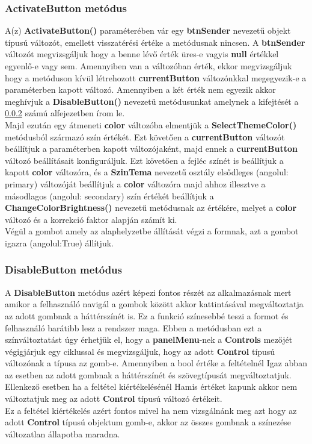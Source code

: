 \documentclass[tocnopagenum]{thesis-ekf}
\theoremstyle{definition}
\theoremstyle{remark}
\begin{document}
	\subsubsection{ActivateButton metódus}
	A(z) \textbf{ActivateButton()} paraméterében vár egy \textbf{btnSender} nevezetű objekt típusú változót, emellett visszatérési értéke a metódusnak nincsen. A \textbf{btnSender} változót megvizsgáljuk hogy a benne lévő érték üres-e vagyis \textbf{null} értékkel egyenlő-e vagy sem. Amennyiben van a változóban érték, ekkor megvizsgáljuk hogy a metóduson kívül létrehozott \textbf{currentButton} változónkkal megegyezik-e a paraméterben kapott változó. Amennyiben a két érték nem egyezik akkor meghívjuk a \textbf{DisableButton()} nevezetű metódusunkat amelynek a kifejtését a \ref{Disablebuttonlabel} számú alfejezetben írom le.
	\\
	 Majd ezután egy átmeneti \textbf{color} változóba elmentjük a \textbf{SelectThemeColor()} metódusból származó szín értékét. Ezt követően a \textbf{currentButton} változót beállítjuk a paraméterben kapott változójaként, majd ennek a \textbf{currentButton} változó beállításait konfiguráljuk. Ezt követően a fejléc színét is beállítjuk a kapott \textbf{color} változóra, és a \textbf{SzinTema} nevezetű osztály elsődleges (angolul: primary) változóját beállítjuk a \textbf{color} változóra majd ahhoz illesztve a másodlagos (angolul: secondary) szín értékét beállítjuk a \textbf{ChangeColorBrightness()} nevezetű metódusnak az értékére, melyet a \textbf{color} változó és a korrekció faktor alapján számít ki.
	 \\
	 Végül a gombot amely az alaphelyzetbe állítását végzi a formnak, azt a gombot igazra (angolul:True) állítjuk.
	\subsubsection{DisableButton metódus}
	\label{Disablebuttonlabel}
	A \textbf{DisableButton} metódus azért képezi fontos részét az alkalmazásnak mert amikor a felhasználó navigál a gombok között akkor kattintásával megváltoztatja az adott gombnak a háttérszínét is. Ez a funkció színesebbé teszi a formot és felhasználó barátibb lesz a rendszer maga. Ebben a metódusban ezt a színváltoztatást úgy érhetjük el, hogy a \textbf{panelMenu}-nek a \textbf{Controls} mezőjét végigjárjuk egy ciklussal és megvizsgáljuk, hogy az adott \textbf{Control} típusú változónak a típusa az gomb-e.
	Amennyiben a bool értéke a feltételnél Igaz abban az esetben az adott gombnak a háttérszínét és szövegtípusát megváltoztatjuk.
	\\
	Ellenkező esetben ha a feltétel kiértékelésénél Hamis értéket kapunk akkor nem változtatjuk meg az adott \textbf{Control} típusú változó értékeit.
	\\ 
	Ez a feltétel kiértékelés azért fontos mivel ha nem vizsgálnánk meg azt hogy az adott \textbf{Control} típusú objektum gomb-e, akkor az összes gombnak a színezése változatlan állapotba maradna.
\end{document}
